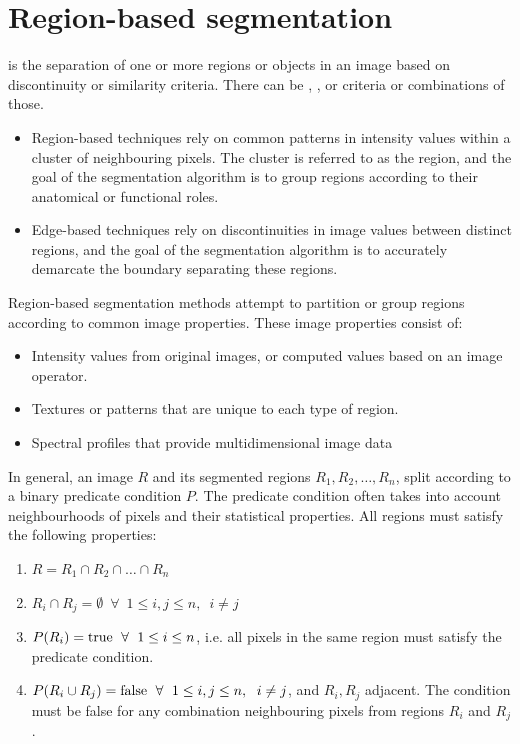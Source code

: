\documentclass[a4paper]{article}
\begin{document}
\section{Region-based segmentation}

 is the separation of one or more regions or objects in an image based on discontinuity or similarity criteria. There can be , , or  criteria or combinations of those.


\begin{itemize}
    \item Region-based techniques rely on common patterns in intensity values within a cluster of neighbouring pixels. The cluster is referred to as the region, and the goal of the segmentation algorithm is to group regions according to their anatomical or functional roles. 
    \item Edge-based techniques rely on discontinuities in image values between distinct regions, and the goal of the segmentation algorithm is to accurately demarcate the boundary separating these regions. 
\end{itemize}
Region-based segmentation methods attempt to partition or group regions according to common image properties. These image properties consist of:
\begin{itemize}
    \item Intensity values from original images, or computed values based on an image operator.
    \item  Textures or patterns that are unique to each type of region.
    \item Spectral profiles that provide multidimensional image data
\end{itemize}
In general, an image $R$ and its segmented regions $R_1, R_2, \ldots, R_n$, split according to a binary predicate condition $P$. The predicate condition often takes into account neighbourhoods of pixels and their statistical properties. All regions must satisfy the following properties:
\begin{enumerate}
    \item $R=R_1 \cap R_2 \cap \ldots \cap R_n$
    \item $R_i \cap R_j = \emptyset \;\ \forall \;\ 1 \leq i,j \leq n, \;\ i \neq j$
    \item $P(R_i)=\textup{true} \; \ \forall \;\ 1 \leq i \leq n$, i.e. all pixels in the same region must satisfy the predicate condition. 
    \item $P(R_i \cup R_j) = \textup{false} \;\ \forall \;\ 1 \leq i,j \leq n, \;\ i \neq j$, and $R_i, R_j$ adjacent. The condition must be false for any combination neighbouring pixels from regions $R_i$ and $R_j$.
\end{enumerate}
\end{document}
